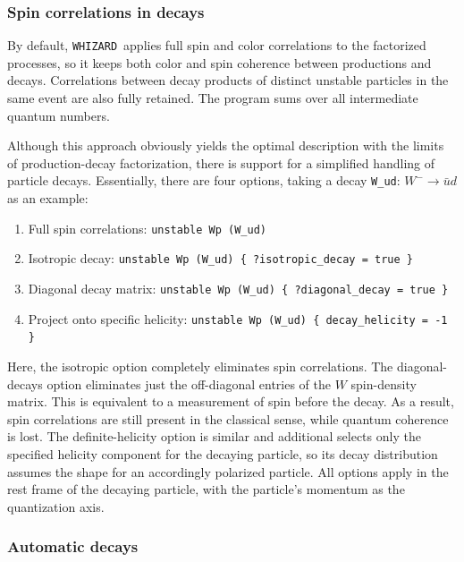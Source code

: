 \documentclass[12pt]{book}
\newcommand{\ttt}[1]{\texttt{#1}}
\newcommand{\whizard}{\ttt{WHIZARD}}
\begin{document}
\subsubsection{Spin correlations in decays}
\label{sec:spin-correlations}

By default, \whizard\ applies full spin and color correlations to the
factorized processes, so it keeps both color and spin coherence between
productions and decays.  Correlations between decay products of distinct
unstable particles in the same event are also fully retained.  The program
sums over all intermediate quantum numbers.

Although this approach obviously yields the optimal description with the
limits of production-decay factorization, there is support for a simplified
handling of particle decays.  Essentially, there are four options, taking a
decay \ttt{W\_ud}: $W^-\to \bar u d$ as an example:
\begin{enumerate}
\item
  Full spin correlations: \verb|unstable Wp (W_ud)|
\item
  Isotropic decay: \verb|unstable Wp (W_ud) { ?isotropic_decay = true }|
\item
  Diagonal decay matrix:
  \verb|unstable Wp (W_ud) { ?diagonal_decay = true }|
\item
  Project onto specific helicity:
  \verb|unstable Wp (W_ud) { decay_helicity = -1 }|
\end{enumerate}
Here, the isotropic option completely eliminates spin correlations.  The
diagonal-decays option eliminates just the off-diagonal entries of the $W$
spin-density matrix.  This is equivalent to a measurement of spin before the
decay.  As a result, spin correlations are still present in the classical
sense, while quantum coherence is lost.  The definite-helicity option is
similar and additional selects only the specified helicity component for the
decaying particle, so its decay distribution assumes the shape for an
accordingly polarized particle.  All options apply in the rest frame of the
decaying particle, with the particle's momentum as the quantization axis.

\subsubsection{Automatic decays}
\end{document}
